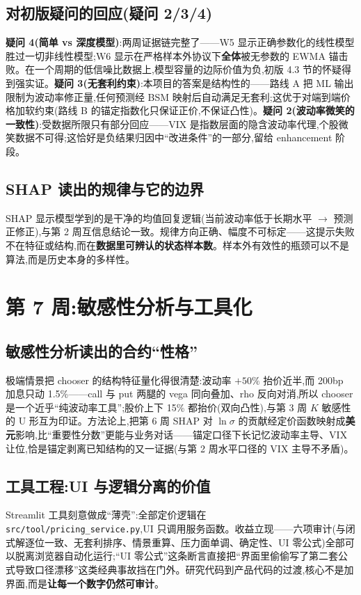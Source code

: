\documentclass[11pt]{ctexart}
\begin{document}
\subsection{对初版疑问的回应(疑问 2/3/4)}
\textbf{疑问 4(简单 vs 深度模型)}:两周证据链完整了——W5 显示正确参数化的线性模型胜过一切非线性模型;W6 显示在严格样本外协议下\textbf{全体}被无参数的 EWMA 锚击败。在一个周期的低信噪比数据上,模型容量的边际价值为负,初版 4.3 节的怀疑得到强实证。\textbf{疑问 3(无套利约束)}:本项目的答案是结构性的——路线 A 把 ML 输出限制为波动率修正量,任何预测经 BSM 映射后自动满足无套利;这优于对端到端价格加软约束(路线 B 的锚定指数化只保证正价,不保证凸性)。\textbf{疑问 2(波动率微笑的一致性)}:受数据所限只有部分回应——VIX 是指数层面的隐含波动率代理,个股微笑数据不可得;这恰好是负结果归因中``改进条件''的一部分,留给 enhancement 阶段。

\subsection{SHAP 读出的规律与它的边界}
SHAP 显示模型学到的是干净的均值回复逻辑(当前波动率低于长期水平 $\to$ 预测正修正),与第 2 周互信息结论一致。规律方向正确、幅度不可标定——这提示失败不在特征或结构,而在\textbf{数据里可辨认的状态样本数}。样本外有效性的瓶颈可以不是算法,而是历史本身的多样性。

\section{第 7 周:敏感性分析与工具化}

\subsection{敏感性分析读出的合约“性格”}
极端情景把 chooser 的结构特征量化得很清楚:波动率 $+50\%$ 抬价近半,而 200bp 加息只动 1.5\%——call 与 put 两腿的 vega 同向叠加、rho 反向对消,所以 chooser 是一个近乎“纯波动率工具”;股价上下 15\% 都抬价(双向凸性),与第 3 周 $K$ 敏感性的 U 形互为印证。方法论上,把第 6 周 SHAP 对 $\ln\sigma$ 的贡献经定价函数映射成\textbf{美元}影响,比“重要性分数”更能与业务对话——锚定口径下长记忆波动率主导、VIX 让位,恰是锚定剥离已知结构的又一证据(与第 2 周水平口径的 VIX 主导不矛盾)。

\subsection{工具工程:UI 与逻辑分离的价值}
Streamlit 工具刻意做成“薄壳”:全部定价逻辑在 \texttt{src/tool/pricing\_service.py},UI 只调用服务函数。收益立现——六项审计(与闭式解逐位一致、无套利排序、情景重算、压力面单调、确定性、UI 零公式)全部可以脱离浏览器自动化运行;“UI 零公式”这条断言直接把“界面里偷偷写了第二套公式导致口径漂移”这类经典事故挡在门外。研究代码到产品代码的过渡,核心不是加界面,而是\textbf{让每一个数字仍然可审计}。
\end{document}
